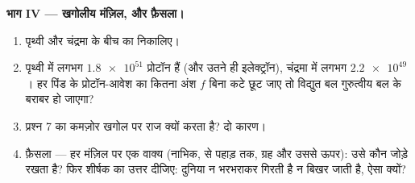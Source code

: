 \begin{problem}
\medskip
\noindent\textbf{भाग IV --- खगोलीय मंज़िल, और फ़ैसला।}
\begin{enumerate}[resume]
  \item पृथ्वी और चंद्रमा के बीच का  निकालिए।
  \item पृथ्वी में लगभग $\num{1.8e51}$ प्रोटॉन हैं (और उतने ही इलेक्ट्रॉन), चंद्रमा
        में लगभग $\num{2.2e49}$। हर पिंड के प्रोटॉन-आवेश का कितना अंश $f$ बिना
        कटे छूट जाए तो विद्युत बल गुरुत्वीय बल के बराबर हो जाएगा?
  \item प्रश्न 7 का कमज़ोर  खगोल पर राज क्यों करता है?
        दो कारण।
  \item फ़ैसला --- हर मंज़िल पर एक वाक्य (नाभिक,  से
        पहाड़ तक, ग्रह और उससे ऊपर): उसे कौन जोड़े रखता है? फिर शीर्षक का
        उत्तर दीजिए: दुनिया न भरभराकर गिरती है न बिखर जाती है, ऐसा क्यों?
\end{enumerate}
\end{problem}
